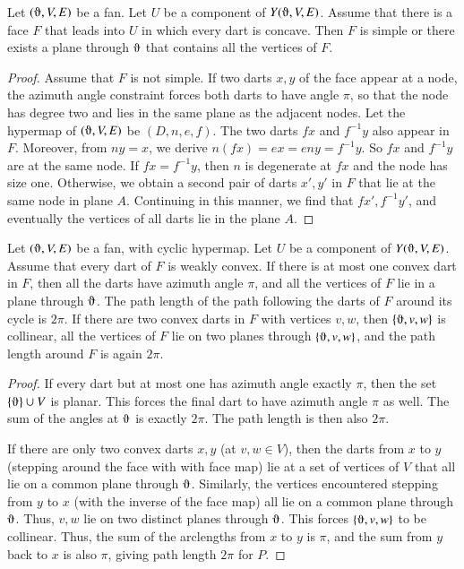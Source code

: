 \begin{lemma}
Let $(\orgn,V,E)$ be a fan.  Let $U$ be a component of $Y(\orgn,V,E)$.  Assume that there is a face  $F$ that leads into $U$ in which every dart is concave.  Then $F$ is simple or there exists a plane through $\orgn$ that contains all the vertices of $F$.
\end{lemma}

\begin{proof}  Assume that $F$ is not simple.
If two darts $x,y$
of the face appear at a node, the azimuth angle constraint forces both darts to
have angle $\pi$, so that the node has degree two and lies in the same plane
as the adjacent nodes. Let the hypermap of $(\orgn,V,E)$ be $(D,n,e,f)$.  The two darts $f x$ and $f^{-1}y$ also appear in $F$.  Moreover, from $n y = x$, we derive $n (f x) = e x = e n y = f^{-1} y$.  So $f x$ and $f^{-1} y$ are at the same node.  If $f x = f^{-1} y$, then $n$ is degenerate at $f x$ and the node has size one.  Otherwise, we obtain a second pair of darts $x',y'$ in $F$ that lie at the same node in plane $A$.
Continuing in this manner, we find that $f x',f^{-1} y'$, and eventually
the vertices of all darts lie in the plane $A$.
\end{proof}

\begin{lemma}
Let $(\orgn,V,E)$ be a fan, with cyclic hypermap.  
Let $U$ be a component of $Y(\orgn,V,E)$.
Assume
that every dart of $F$ is weakly convex.  If there is at most
one convex dart in $F$, then all the darts have azimuth angle $\pi$,
and all the vertices of $F$ lie in a plane through $\orgn$.  The path length of the path following the darts of $F$ around its cycle is $2\pi$.
If there are two convex darts in $F$ with vertices $v,w$, then
$\{\orgn,v,w\}$ is collinear, all the vertices of $F$ lie on two planes through $\{\orgn,v,w\}$, and the path length around $F$ is again $2\pi$.
\end{lemma}

\begin{proof}
If every dart but at most one 
has azimuth angle exactly $\pi$, then the set $\{\orgn\}\cup V$ is
planar.  This forces the final dart to have azimuth angle $\pi$ as well. 
The sum of the angles at $\orgn$ is exactly $2\pi$.  The path length
is then also $2\pi$.

If there are only two convex darts $x,y$ (at $v,w\in V$), 
then the darts from $x$ to $y$ (stepping around the face with with face map) lie at a set of vertices of $V$ that all lie on a common plane through $\orgn$.  Similarly, the vertices encountered stepping from $y$ to $x$ (with the inverse of the face map) all lie on a common plane through $\orgn$.  Thus, $v,w$ lie on two distinct planes through $\orgn$.  This forces $\{\orgn,v,w\}$ to be collinear.
Thus, the sum of the arclengths from $x$ to $y$ is $\pi$, and the sum from $y$ back to $x$ is also $\pi$, giving path length $2\pi$ for $P$.
\end{proof}

